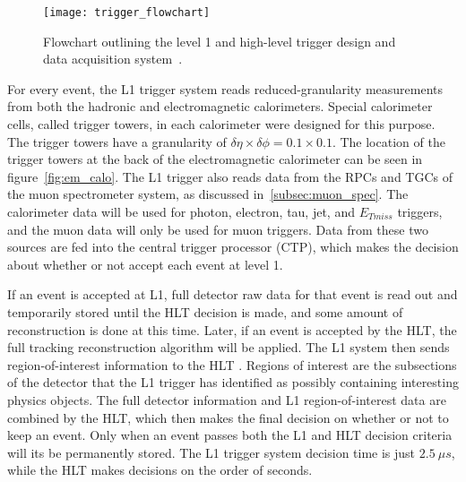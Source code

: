 \begin{figure}[!ht]\centering
\texttt{[image: trigger\_flowchart]}
\caption{Flowchart outlining the level 1 and high-level trigger design and data acquisition system~\cite{atlas-trigger}.}
\label{fig:trigger_flowchart}
\end{figure}

For every event, the L1 trigger system reads reduced-granularity measurements from both the hadronic and electromagnetic calorimeters.
Special calorimeter cells, called trigger towers, in each calorimeter were designed for this purpose.
The trigger towers have a granularity of $\delta \eta \times \delta \phi = 0.1 \times 0.1$.
The location of the trigger towers at the back of the electromagnetic calorimeter can be seen in figure~\ref{fig:em_calo}.
The L1 trigger also reads data from the RPCs and TGCs of the muon spectrometer system, as discussed in~\ref{subsec:muon_spec}.
The calorimeter data will be used for photon, electron, tau, jet, and $E_{Tmiss}$ triggers, and the muon data will only be used for muon triggers.
Data from these two sources are fed into the central trigger processor (CTP), which makes the decision about whether or not accept each event at level 1.

If an event is accepted at L1, full detector raw data for that event is read out and temporarily stored until the HLT decision is made, and some amount of reconstruction is done at this time.
Later, if an event is accepted by the HLT, the full tracking reconstruction algorithm will be applied.
The L1 system then sends region-of-interest information to the HLT .
Regions of interest are the subsections of the detector that the L1 trigger has identified as possibly containing interesting physics objects.
The full detector information and L1 region-of-interest data are combined by the HLT, which then makes the final decision on whether or not to keep an event.
Only when an event passes both the L1 and HLT decision criteria will its be permanently stored.
The L1 trigger system decision time is just $2.5~\mu s$, while the HLT makes decisions on the order of seconds.
